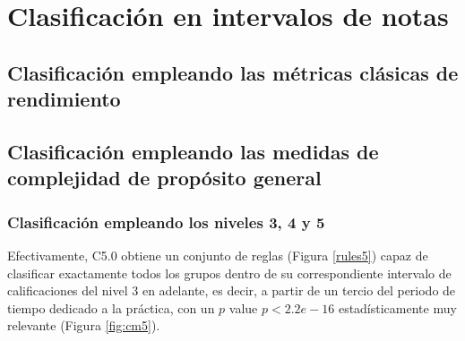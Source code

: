 \section{Clasificación en intervalos de notas}\label{sec:intervals}

\subsection{Clasificación empleando las métricas clásicas de rendimiento}

\subsection{Clasificación empleando las medidas de complejidad de propósito general}

\subsubsection{Clasificación empleando los niveles 3, 4 y 5}

Efectivamente, C5.0 obtiene un conjunto de reglas (Figura \ref{rules5}) capaz de clasificar exactamente todos los grupos dentro de su correspondiente intervalo de calificaciones del nivel $3$ en adelante, es decir, a partir de un tercio del periodo de tiempo dedicado a la práctica, con un $p$ value $p < 2.2e-16$ estadísticamente muy relevante (Figura \ref{fig:cm5}).

